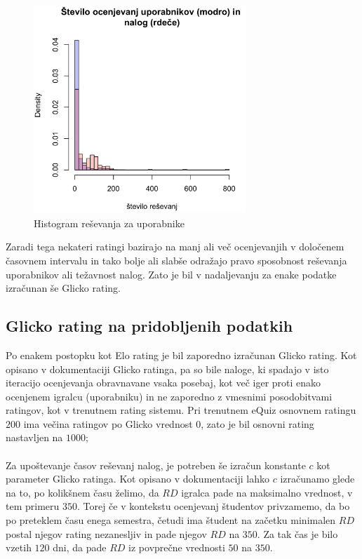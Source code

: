\documentclass{IEEEtran}
\makeatletter
\let\old@subsection\subsection
\renewcommand{\subsection}[1]{\bigskip\old@subsection{#1}\@afterindentfalse\@afterheading}
\makeatother
\begin{document}
\begin{figure}[h!]
    \includegraphics[width=8cm]{ResevanjeComb}
    \caption{Histogram reševanja za uporabnike}%
    \label{fig:example}%
\end{figure}


\newpage
Zaradi tega nekateri ratingi bazirajo na manj ali več ocenjevanjih v določenem časovnem intervalu in tako bolje ali slabše odražajo pravo sposobnost reševanja uporabnikov ali težavnost nalog. Zato je bil v nadaljevanju za enake podatke izračunan še Glicko rating.

\subsection{Glicko rating na pridobljenih podatkih}
\label{sec:izracun}

Po enakem postopku kot Elo rating je bil zaporedno izračunan Glicko rating. Kot opisano v dokumentaciji Glicko ratinga, pa so bile naloge,
ki spadajo v isto iteracijo ocenjevanja obravnavane vsaka posebaj, kot več iger proti enako ocenjenem igralcu (uporabniku) in ne zaporedno z vmesnimi posodobitvami ratingov, kot v trenutnem rating sistemu. Pri trenutnem eQuiz osnovnem ratingu $200$ ima večina ratingov po Glicko vrednost $0$,
zato je bil osnovni rating nastavljen na $1000$;
\hfill
\\
\\
Za upoštevanje časov reševanj nalog, je potreben še izračun konstante $c$ kot parameter Glicko ratinga. Kot opisano v dokumentaciji lahko $c$
izračunamo glede na to, po kolikšnem času želimo, da $RD$ igralca pade na maksimalno vrednost, v tem primeru $350$. Torej če v kontekstu ocenjevanj študentov privzamemo, da bo po preteklem času enega semestra, četudi ima študent na začetku minimalen $RD$ postal njegov rating nezanesljiv in pade njegov $RD$ na $350$. Za tak čas je bilo vzetih $120$ dni, da pade $RD$ iz povprečne vrednosti $50$ na $350$.
\end{document}
